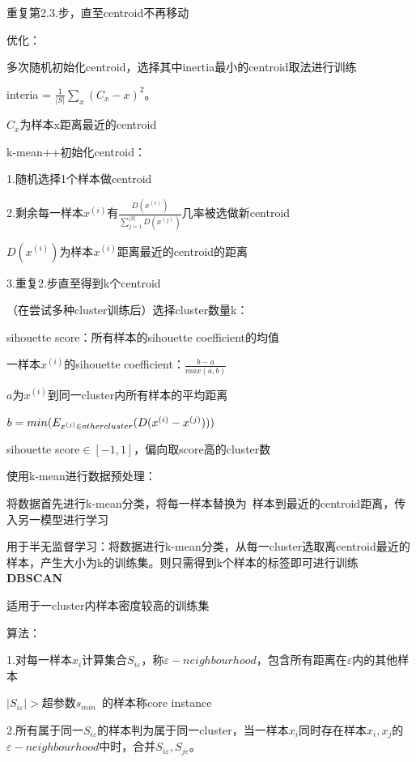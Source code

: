 \documentclass[UTF8]{ctexart}
\begin{document}
  \quad 重复第2.3.步，直至centroid不再移动

  优化：
  
  \quad 多次随机初始化centroid，选择其中inertia最小的centroid取法进行训练

  \quad \quad interia = $\frac{1}{|S|}\sum_x (C_x - x)^2$。

  \quad \quad \quad $C_x$为样本x距离最近的centroid

  \quad k-mean++初始化centroid：

  \quad \quad 1.随机选择1个样本做centroid

  \quad \quad 2.剩余每一样本$x^{(i)}$有$\frac{D(x^{(i)})}{\sum_{j=1}^{|S|} D(x^{(j)})}$几率被选做新centroid

  \quad \quad \quad $D(x^{(i)})$为样本$x^{(i)}$距离最近的centroid的距离

  \quad \quad 3.重复2.步直至得到k个centroid

  \quad （在尝试多种cluster训练后）选择cluster数量k：

  \quad \quad sihouette score：所有样本的sihouette coefficient的均值

  \quad \quad \quad 一样本$x^{(i)}$的sihouette coefficient：$\frac{b-a}{max(a, b)}$

  \quad \quad \quad \quad $a$为$x^{(i)}$到同一cluster内所有样本的平均距离
  
  \quad \quad \quad \quad $b = min(E_{x^{(j)} \in other \space cluster}(D(x^{(i)} - x^{(j)})))$

  \quad \quad \quad sihouette score$\in [-1, 1]$，偏向取score高的cluster数

  使用k-mean进行数据预处理：

  \quad 将数据首先进行k-mean分类，将每一样本替换为\ 样本到最近的centroid距离，传入另一模型进行学习

  \quad 用于半无监督学习：将数据进行k-mean分类，从每一cluster选取离centroid最近的样本，产生大小为k的训练集。则只需得到k个样本的标签即可进行训练\\
\textbf{DBSCAN}

  适用于一cluster内样本密度较高的训练集

  算法：

  \quad 1.对每一样本$x_i$计算集合$S_{i\varepsilon}$，称$\varepsilon -neighbourhood$，包含所有距离在$\varepsilon $内的其他样本

  \quad \quad $|S_{i\varepsilon}| > $超参数$s_{min}$\ 的样本称core instance

  \quad 2.所有属于同一$S_{i\varepsilon }$的样本判为属于同一cluster，当一样本$x_i$同时存在样本$x_i, x_j$的$\varepsilon -neighbourhood$中时，合并$S_{i\varepsilon }, S_{j\varepsilon }$。
\end{document}
